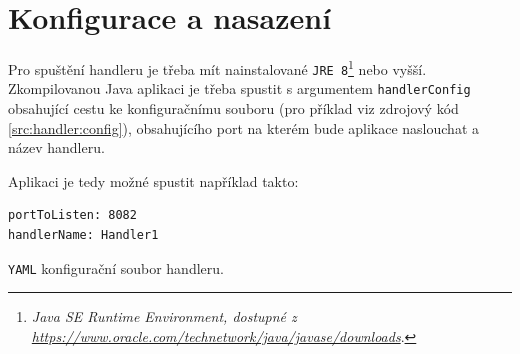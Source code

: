 \section{Konfigurace a nasazení}\label{chap:handler:config}
Pro spuštění handleru je třeba mít nainstalované \texttt{JRE 8}\footnote{\textit{Java SE Runtime Environment, dostupné z\\\url{https://www.oracle.com/technetwork/java/javase/downloads}}.} nebo vyšší.
Zkompilovanou Java aplikaci je třeba spustit s argumentem \texttt{handlerConfig} obsahující cestu ke konfiguračnímu souboru (pro příklad viz zdrojový kód \ref{src:handler:config}), obsahujícího port na kterém bude aplikace naslouchat a název handleru.

Aplikaci je tedy možné spustit například takto: 

\begin{code}[h]
  \begin{verbatim}
portToListen: 8082
handlerName: Handler1
\end{verbatim}
\caption{\texttt{YAML} konfigurační soubor handleru.}
\label{src:handler:config}
\end{code}